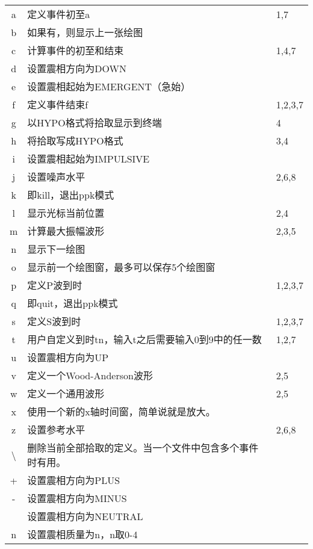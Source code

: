\begin{center}
\begin{longtable}{cll}
a       &   定义事件初至a                           &   1,7     \\
b       &   如果有，则显示上一张绘图                &           \\
c       &   计算事件的初至和结束                    &   1,4,7   \\
d       &   设置震相方向为DOWN                      &           \\
e       &   设置震相起始为EMERGENT（急始）          &           \\
f       &   定义事件结束f                           &  1,2,3,7  \\
g       &   以HYPO格式将拾取显示到终端              &   4       \\
h       &   将拾取写成HYPO格式                      &   3,4     \\
i       &   设置震相起始为IMPULSIVE                 &           \\
j       &   设置噪声水平                            &   2,6,8   \\
k       &   即kill，退出ppk模式                     &           \\
l       &   显示光标当前位置                        &   2,4     \\
m       &   计算最大振幅波形                        &   2,3,5   \\
n       &   显示下一绘图                            &           \\
o       &   显示前一个绘图窗，最多可以保存5个绘图窗 &           \\
p       &   定义P波到时                             &   1,2,3,7 \\
q       &   即quit，退出ppk模式                             &           \\
s       &   定义S波到时                             &   1,2,3,7 \\
t       &   用户自定义到时tn，输入t之后需要输入0到9中的任一数   &   1,2,7\\
u       &   设置震相方向为UP                        &           \\
v       &   定义一个Wood-Anderson波形               &   2,5     \\
w       &   定义一个通用波形                        &   2,5     \\
x       &   使用一个新的x轴时间窗，简单说就是放大。 &           \\
z       &   设置参考水平                            &   2,6,8   \\
\textbackslash      &   删除当前全部拾取的定义。当一个文件中包含多个事件时有用。&   \\
+       &   设置震相方向为PLUS                      &           \\
-       &   设置震相方向为MINUS                     &           \\
\lstinline[showspaces]! !   &   设置震相方向为NEUTRAL                   &           \\
n       &   设置震相质量为n，n取0-4                 &           \\
\end{longtable}
\end{center}

